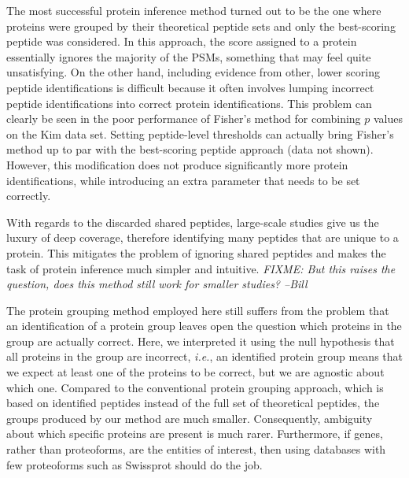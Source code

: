\documentclass{article}
\begin{document}
The most successful protein inference method turned out to be the one
where proteins were grouped by their theoretical peptide sets and only
the best-scoring peptide was considered. In this approach, the score
assigned to a protein essentially ignores the majority of the PSMs,
something that may feel quite unsatisfying. On the other hand,
including evidence from other, lower scoring peptide identifications
is difficult because it often involves lumping incorrect peptide
identifications into correct protein identifications.  This problem
can clearly be seen in the poor performance of Fisher's method for
combining $p$ values on the Kim data set. Setting peptide-level
thresholds can actually bring Fisher's method up to par with the
best-scoring peptide approach (data not shown). However, this
modification does not produce significantly more protein
identifications, while introducing an extra parameter that needs to be
set correctly.

With regards to the discarded shared peptides, large-scale studies
give us the luxury of deep coverage, therefore identifying many
peptides that are unique to a protein. This mitigates the problem of
ignoring shared peptides and makes the task of protein inference much
simpler and intuitive.  {\em FIXME: But this raises the question, does
  this method still work for smaller studies? --Bill}

The protein grouping method employed here still suffers from the
problem that an identification of a protein group leaves open the
question which proteins in the group are actually correct. Here, we
interpreted it using the null hypothesis that all proteins in the
group are incorrect, {\em i.e.}, an identified protein group means
that we expect at least one of the proteins to be correct, but we are
agnostic about which one. Compared to the conventional protein
grouping approach, which is based on identified peptides instead of
the full set of theoretical peptides, the groups produced by our
method are much smaller.  Consequently, ambiguity about which specific
proteins are present is much rarer.  Furthermore, if genes, rather
than proteoforms, are the entities of interest, then using databases
with few proteoforms such as Swissprot should do the job.
\end{document}

